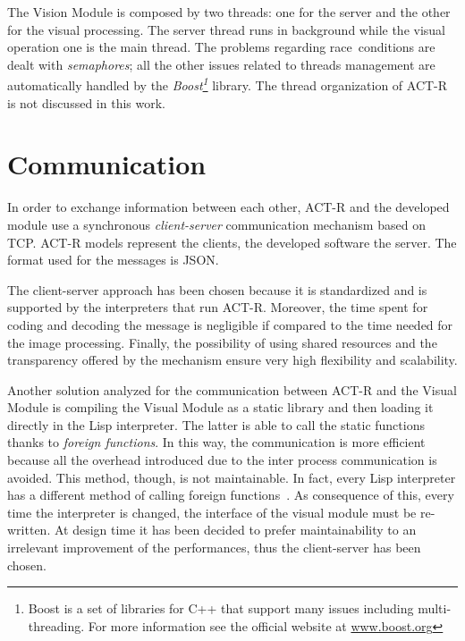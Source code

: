 	
	The Vision Module is composed by two threads: one for the server and the other for the visual processing. 
	The server thread runs in background while the visual operation one is the main thread.
	The problems regarding \mbox{race conditions} are dealt with \emph{semaphores}; all the other issues related to threads management are automatically handled by the \emph{Boost\footnote{Boost is a set of libraries for C++ that support many issues including multi-threading. For more information see the official website at \url{www.boost.org}}} library. 
	The thread organization of \mbox{ACT-R} is not discussed in this work.	


	\section{Communication}
	In order to exchange information between each other, \mbox{ACT-R} and the developed module use a synchronous \emph{client-server} communication mechanism based on \mbox{TCP}. 
	\mbox{ACT-R} models represent the clients, the developed software the server. 
	The format used for the messages is \mbox{JSON}.  		

	The client-server approach has been chosen because it is standardized and is supported by the interpreters that run \mbox{ACT-R}. 
	Moreover, the time spent for coding and decoding the message is negligible if compared to the time needed for the image processing.
	Finally, the possibility of using shared resources and the transparency offered by the mechanism ensure very high flexibility and scalability.
	

	Another solution analyzed for the communication between \mbox{ACT-R} and the Visual Module is compiling the Visual Module as a static library and then loading it directly in the \mbox{Lisp} interpreter.
	The latter is able to call the static functions thanks to \emph{foreign functions}.
	In this way, the communication is more efficient because all the overhead introduced due to the inter process communication is avoided. 
	This method, though, is not maintainable. 
	In fact, every \mbox{Lisp} interpreter has a different method of calling foreign functions~\cite{SWIGDoc}. 
	As consequence of this, every time the interpreter is changed, the interface of the visual module must be re-written.
 	At design time it has been decided to prefer maintainability to an irrelevant improvement of the performances, thus the client-server has been chosen.

